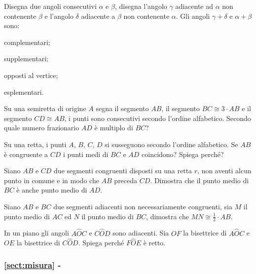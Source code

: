 \begin{esercizio}
\label{ese:1.83}
Disegna due angoli consecutivi $\alpha$ e $\beta$, disegna l'angolo 
$\gamma$ adiacente ad $\alpha$ non contenente $\beta$ e l'angolo 
$\delta$ adiacente a $\beta$ non contenente $\alpha$. Gli angoli 
$\gamma + \delta$ e $\alpha+\beta$ sono:
\begin{multicols}{2}
\begin{enumeratea}
\item complementari;
\item supplementari;
\item opposti al vertice;
\item esplementari.
\end{enumeratea}
\end{multicols}
\end{esercizio}

\begin{multicols}{2}
 
\begin{esercizio}
\label{ese:1.84}
Su una semiretta di origine $A$ segna il segmento $AB$, il segmento 
$BC\cong 3\cdot AB$ e il segmento $CD\cong AB$, i punti sono 
consecutivi secondo l'ordine alfabetico. Secondo quale numero 
frazionario $AD$ è multiplo di $BC$?
\end{esercizio}

\begin{esercizio}
\label{ese:1.87}
Su una retta, i punti $A$, $B$, $C$, $D$ si susseguono secondo 
l'ordine alfabetico. Se $AB$ è congruente a $CD$ i punti medi di $BC$ 
e $AD$ coincidono? Spiega perché?
\end{esercizio}

\begin{esercizio}
\label{ese:1.89}
Siano $AB$ e $CD$ due segmenti congruenti disposti su una retta $r$, 
non aventi alcun punto in comune e in modo che $AB$ preceda $CD$. 
Dimostra che il punto medio di $BC$ è anche punto medio di $AD$.
\end{esercizio}

\begin{esercizio}
\label{ese:1.92}
Siano $AB$ e $BC$ due segmenti adiacenti non necessariamente 
congruenti, sia $M$ il punto medio di $AC$ ed $N$ il punto medio di 
$BC$, dimostra che $MN\cong \frac{1}{2}\cdot AB$.
\end{esercizio}

\begin{esercizio}
\label{ese:1.95}
In un piano gli angoli $A\widehat{O}C$ e $C\widehat{O}D$ sono 
adiacenti. Sia $OF$ la bisettrice di $A\widehat{O}C$ e $OE$ la 
bisettrice di $C\widehat{O}D$. Spiega perché $F\widehat{O}E$ è retto.
\end{esercizio}

\begingroup
\hypersetup{linkcolor=black}
\subsubsection*{\ref{sect:misura} - }
\endgroup

\end{multicols}

